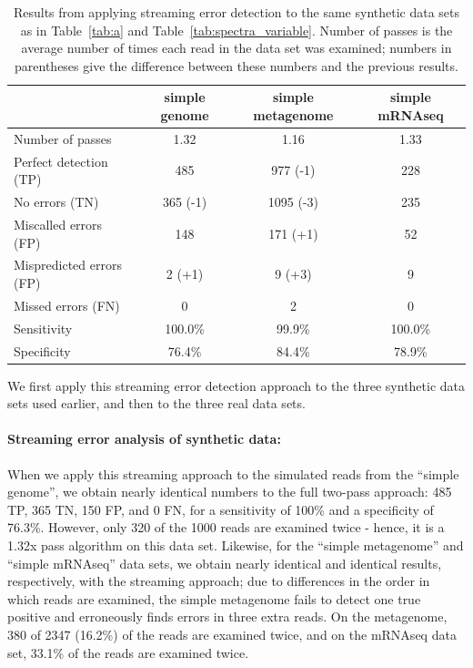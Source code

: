 \documentclass{article}
\begin{document}
\begin{table}
\begin{tabular}{|l|c||c||c|}
\hline
& simple genome & simple metagenome & simple mRNAseq \\
\hline
Number of passes & 1.32 & 1.16 & 1.33 \\
\hline
Perfect detection (TP) & 485 & 977 (-1) & 228 \\
No errors (TN) & 365 (-1) & 1095 (-3) & 235 \\
Miscalled errors (FP) & 148 & 171 (+1) & 52 \\
Mispredicted errors (FP) & 2 (+1) & 9 (+3) & 9 \\
Missed errors (FN) & 0 & 2 & 0 \\
\hline
Sensitivity & 100.0\% & 99.9\% & 100.0\% \\
Specificity & 76.4\% & 84.4\% & 78.9\% \\
\hline
\end{tabular}
\label{tab:spectra_streaming}

\caption{Results from applying streaming error detection to the same
  synthetic data sets as in Table~\ref{tab:a} and
  Table~\ref{tab:spectra_variable}.  Number of passes is the average
  number of times each read in the data set was examined; numbers in
  parentheses give the difference between these numbers and the
  previous results.}
\end{table}

We first apply this streaming error detection approach to the three
synthetic data sets used earlier, and then to the three real data sets.

\paragraph{Streaming error analysis of synthetic data:}

When we apply this streaming approach to the simulated reads from the
``simple genome'', we obtain nearly identical numbers to the full two-pass
approach: 485 TP, 365 TN, 150 FP, and 0 FN, for a sensitivity of 100\%
and a specificity of 76.3\%.  However, only 320 of the 1000 reads are
examined twice - hence, it is a 1.32x pass algorithm on this data set.
Likewise, for the ``simple metagenome''
and ``simple mRNAseq'' data sets, we obtain nearly identical and
identical results, respectively, with the streaming approach; due to
differences in the order in which reads are examined, the simple
metagenome fails to detect one true positive and erroneously finds
errors in three extra reads.  On the metagenome, 380 of 2347 (16.2\%) of
the reads are examined twice, and on the mRNAseq data set, 33.1\% of the
reads are examined twice.
\end{document}

